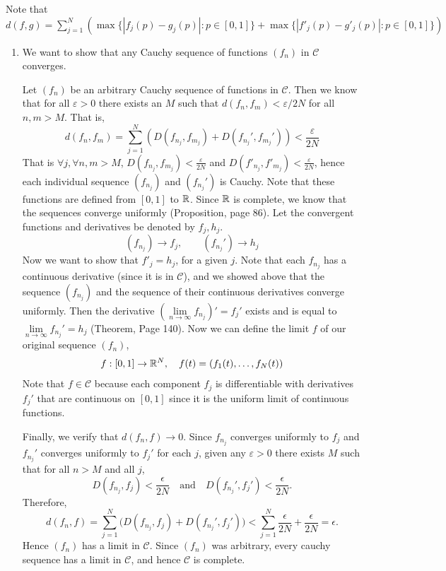 \documentclass[12pt]{article}
\begin{document}
\begin{solution}
    \bbni 

    Note that $d(f, g) = \sum_{j=1}^N (\max \{|f_j(p) - g_j(p)|: p \in [0,1]\} + \max \{|f'_j(p) - g'_j(p)|: p \in [0,1]\})$
    \begin{enumerate}
        \item [(a)] We want to show that any Cauchy sequence of functions $(f_n)$ in $\mathcal{C}$ converges. 
        
        Let $(f_n)$ be an arbitrary Cauchy sequence of functions in $\mathcal{C}$. Then we know that for all $\varepsilon >0$ there exists an $M$ such that $d(f_n, f_m) < \varepsilon/2N$ for all $n, m > M$. That is, 
        \[d(f_n, f_m) = \sum_{j=1}^N (D(f_{n_j},f_{m_j}) + D(f_{n_j}',f_{m_j}')) 
        < \frac{\varepsilon}{2N}\]
        That is $\forall j, \forall n, m > M$, $D(f_{n_j},f_{m_j}) < \frac{\varepsilon}{2N}$ and $D(f'_{n_j},f'_{m_j}) < \frac{\varepsilon}{2N}$, hence each individual sequence $(f_{n_j})$ and $(f_{n_j}')$ is Cauchy. Note that these functions are defined from $[0,1]$ to $\mathbb R$. Since $\mathbb R$ is complete, we know that the sequences converge uniformly (Proposition, page 86). Let the convergent functions and derivatives be denoted by $f_j, h_j$.  
        \[(f_{n_j}) \to f_j, \qquad (f_{n_j}') \to h_j\]
        Now we want to show that $f'_j = h_j$, for a given $j$. Note that each $f_{n_j}$ has a continuous derivative (since it is in $\mathcal{C}$), and we showed above that the sequence $(f_{n_j})$ and the sequence of their continuous derivatives converge uniformly. Then the derivative $\left (\underset{n\to \infty}{\lim} f_{n_j} \right )' = f_j'$ exists and is equal to $\underset{n\to \infty}{\lim} f_{n_j}' = h_j$ (Theorem, Page 140). Now we can define the limit $f$ of our original sequence $(f_n)$, 
        \[f: [0,1] \to \mathbb R^N, \quad f(t) = (f_1(t), \ldots, f_N(t))\]
        Note that $f\in \mathcal{C}$ because each component $f_j$ is differentiable with derivatives $f_j'$ that are continuous on $[0,1]$ since it is the uniform limit of continuous functions.

        Finally, we verify that $d(f_n, f) \to 0$. Since $f_{n_j}$ converges uniformly to $f_j$ and $f_{n_j}'$ converges uniformly to  $f_j'$ for each $j$, given any $\varepsilon > 0$ 
        there exists $M$ such that for all $n > M$ and all $j$,
        \[
        D(f_{n_j}, f_j) < \frac{\epsilon}{2N} \quad \text{and} \quad D(f_{n_j}', f_j') < \frac{\epsilon}{2N}.
        \]
        Therefore,
        \[
        d(f_n, f) = \sum_{j=1}^N \bigl(D(f_{n_j}, f_j) + D(f_{n_j}', f_j')\bigr) 
        < \sum_{j=1}^N \frac{\epsilon}{2N} + \frac{\epsilon}{2N} = \epsilon.
        \]
        Hence $(f_n)$ has a limit in $\mathcal{C}$. Since $(f_n)$ was arbitrary, every cauchy sequence has a limit in $\mathcal{C}$, and hence $\mathcal{C}$ is complete.



\end{enumerate}
\end{solution}
\end{document}
